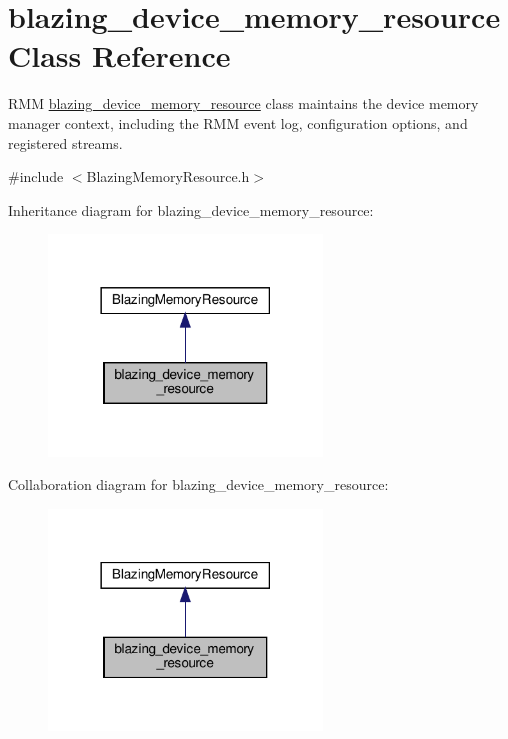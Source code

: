 \hypertarget{classblazing__device__memory__resource}{}\section{blazing\+\_\+device\+\_\+memory\+\_\+resource Class Reference}
\label{classblazing__device__memory__resource}


R\+MM \hyperlink{classblazing__device__memory__resource}{blazing\+\_\+device\+\_\+memory\+\_\+resource} class maintains the device memory manager context, including the R\+MM event log, configuration options, and registered streams.  




{\ttfamily \#include $<$Blazing\+Memory\+Resource.\+h$>$}



Inheritance diagram for blazing\+\_\+device\+\_\+memory\+\_\+resource\+:\nopagebreak
\begin{figure}[H]
\begin{center}
\leavevmode
\includegraphics[width=206pt]{classblazing__device__memory__resource__inherit__graph}
\end{center}
\end{figure}


Collaboration diagram for blazing\+\_\+device\+\_\+memory\+\_\+resource\+:\nopagebreak
\begin{figure}[H]
\begin{center}
\leavevmode
\includegraphics[width=206pt]{classblazing__device__memory__resource__coll__graph}
\end{center}
\end{figure}
